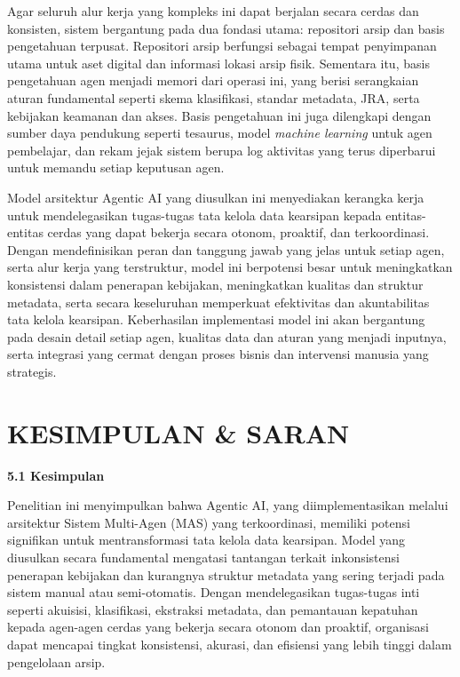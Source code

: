 Agar seluruh alur kerja yang kompleks ini dapat berjalan secara cerdas
dan konsisten, sistem bergantung pada dua fondasi utama: repositori
arsip dan basis pengetahuan terpusat. Repositori arsip berfungsi sebagai
tempat penyimpanan utama untuk aset digital dan informasi lokasi arsip
fisik. Sementara itu, basis pengetahuan agen menjadi memori dari operasi
ini, yang berisi serangkaian aturan fundamental seperti skema
klasifikasi, standar metadata, JRA, serta kebijakan keamanan dan akses.
Basis pengetahuan ini juga dilengkapi dengan sumber daya pendukung
seperti tesaurus, model \emph{machine learning} untuk agen pembelajar,
dan rekam jejak sistem berupa log aktivitas yang terus diperbarui untuk
memandu setiap keputusan agen.

Model arsitektur Agentic AI yang diusulkan ini menyediakan kerangka
kerja untuk mendelegasikan tugas-tugas tata kelola data kearsipan kepada
entitas-entitas cerdas yang dapat bekerja secara otonom, proaktif, dan
terkoordinasi. Dengan mendefinisikan peran dan tanggung jawab yang jelas
untuk setiap agen, serta alur kerja yang terstruktur, model ini
berpotensi besar untuk meningkatkan konsistensi dalam penerapan
kebijakan, meningkatkan kualitas dan struktur metadata, serta secara
keseluruhan memperkuat efektivitas dan akuntabilitas tata kelola
kearsipan. Keberhasilan implementasi model ini akan bergantung pada
desain detail setiap agen, kualitas data dan aturan yang menjadi
inputnya, serta integrasi yang cermat dengan proses bisnis dan
intervensi manusia yang strategis.

\hypertarget{kesimpulan-saran}{%
\section{KESIMPULAN \& SARAN}\label{kesimpulan-saran}}

\textbf{5.1 Kesimpulan}

Penelitian ini menyimpulkan bahwa Agentic AI, yang diimplementasikan
melalui arsitektur Sistem Multi-Agen (MAS) yang terkoordinasi, memiliki
potensi signifikan untuk mentransformasi tata kelola data kearsipan.
Model yang diusulkan secara fundamental mengatasi tantangan terkait
inkonsistensi penerapan kebijakan dan kurangnya struktur metadata yang
sering terjadi pada sistem manual atau semi-otomatis. Dengan
mendelegasikan tugas-tugas inti seperti akuisisi, klasifikasi, ekstraksi
metadata, dan pemantauan kepatuhan kepada agen-agen cerdas yang bekerja
secara otonom dan proaktif, organisasi dapat mencapai tingkat
konsistensi, akurasi, dan efisiensi yang lebih tinggi dalam pengelolaan
arsip.

